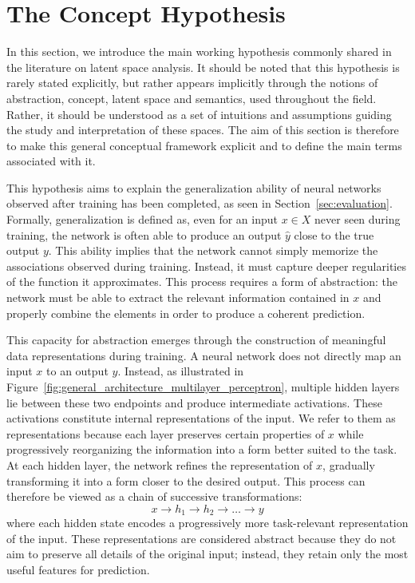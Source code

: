 \section{The Concept Hypothesis}

In this section, we introduce the main working hypothesis commonly shared in the literature on latent space analysis.
It should be noted that this hypothesis is rarely stated explicitly, but rather appears implicitly through the notions of abstraction, concept, latent space and semantics, used throughout the field.
Rather, it should be understood as a set of intuitions and assumptions guiding the study and interpretation of these spaces.
The aim of this section is therefore to make this general conceptual framework explicit and to define the main terms associated with it.

This hypothesis aims to explain the generalization ability of neural networks observed after training has been completed, as seen in Section~\ref{sec:evaluation}.
Formally, generalization is defined as, even for an input $x \in X$ never seen during training, the network is often able to produce an output $\hat{y}$ close to the true output $y$.
This ability implies that the network cannot simply memorize the associations observed during training.
Instead, it must capture deeper regularities of the function it approximates.
This process requires a form of abstraction: the network must be able to extract the relevant information contained in $x$ and properly combine the elements in order to produce a coherent prediction.

This capacity for abstraction emerges through the construction of meaningful data representations during training.
A neural network does not directly map an input $x$ to an output $y$.
Instead, as illustrated in Figure~\ref{fig:general_architecture_multilayer_perceptron}, multiple hidden layers lie between these two endpoints and produce intermediate activations.
These activations constitute internal representations of the input.
We refer to them as representations because each layer preserves certain properties of $x$ while progressively reorganizing the information into a form better suited to the task.
At each hidden layer, the network refines the representation of $x$, gradually transforming it into a form closer to the desired output.
This process can therefore be viewed as a chain of successive transformations:
\[
x \rightarrow h_1 \rightarrow h_2 \rightarrow \dots \rightarrow y
\]
where each hidden state encodes a progressively more task-relevant representation of the input.
These representations are considered abstract because they do not aim to preserve all details of the original input; instead, they retain only the most useful features for prediction.

